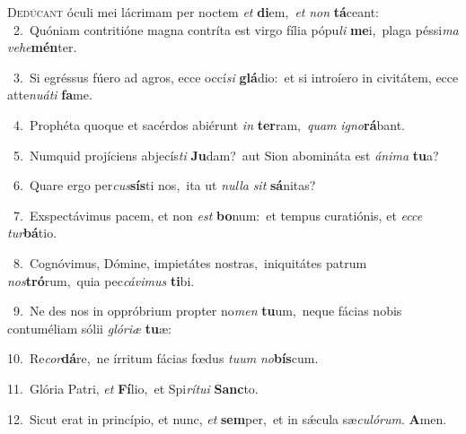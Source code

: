 \lettrine{\initial\textcolor{\initialcolor}{D}}{edúcant} óculi mei lácrimam per noctem \textit{et} \textbf{di}\-em,~\star \textit{et} \textit{non} \textbf{tá}\-ceant:\\
{\numbfont\textcolor{\numbcolor}{~2.}}~Quóniam contritióne magna contríta est virgo fília pópu\textit{li} \textbf{me}\-i,~\star plaga péssi\textit{ma} \textit{ve}\-\textit{he}\textbf{mén}ter.\par
{\numbfont\textcolor{\numbcolor}{~3.}}~Si egréssus fúero ad agros, ecce occí\textit{si} \textbf{glá}\-dio:~\star et si introíero in civitátem, ecce atte\-\textit{nu}\-\textit{á}\textit{ti} \textbf{fa}\-me.\par
{\numbfont\textcolor{\numbcolor}{~4.}}~Prophéta quoque et sacérdos abiérunt \textit{in} \textbf{ter}\-ram,~\star \textit{quam} \textit{i}\-\textit{gno}\textbf{rá}bant.\par
{\numbfont\textcolor{\numbcolor}{~5.}}~Numquid projíciens abjecís\textit{ti} \textbf{Ju}\-dam?~\star aut Sion abomináta est \textit{á}\-\textit{ni}\textit{ma} \textbf{tu}\-a?\par
{\numbfont\textcolor{\numbcolor}{~6.}}~Quare ergo per\-\textit{cus}\-\textbf{sís}ti nos,~\star ita ut \textit{nul}\-\textit{la} \textit{sit} \textbf{sá}\-nitas?\par
{\numbfont\textcolor{\numbcolor}{~7.}}~Exspectávimus pacem, et non \textit{est} \textbf{bo}\-num:~\star et tempus curatiónis, et \textit{ec}\-\textit{ce} \textit{tur}\-\textbf{bá}tio.\par
{\numbfont\textcolor{\numbcolor}{~8.}}~Cognóvimus, Dómine, impietátes nostras,~\dagger iniquitátes patrum \textit{nos}\-\textbf{tró}rum,~\star quia pec\-\textit{cá}\-\textit{vi}\textit{mus} \textbf{ti}\-bi.\par
{\numbfont\textcolor{\numbcolor}{~9.}}~Ne des nos in oppróbrium propter no\textit{men} \textbf{tu}\-um,~\star neque fácias nobis contuméliam sólii \textit{gló}\-\textit{ri}\textit{æ} \textbf{tu}\-æ:\par
{\numbfont\textcolor{\numbcolor}{10.}}~Re\-\textit{cor}\-\textbf{dá}re,~\star ne írritum fácias fœdus \textit{tu}\-\textit{um} \textit{no}\-\textbf{bís}cum.\par
{\numbfont\textcolor{\numbcolor}{11.}}~Glória Patri, \textit{et} \textbf{Fí}\-lio,~\star et Spi\-\textit{rí}\-\textit{tu}\textit{i} \textbf{Sanc}\-to.\par
{\numbfont\textcolor{\numbcolor}{12.}}~Sicut erat in princípio, et nunc, \textit{et} \textbf{sem}\-per,~\star et in sǽcula sæ\-\textit{cu}\-\textit{ló}\textit{rum}. \textbf{A}\-men.\par
